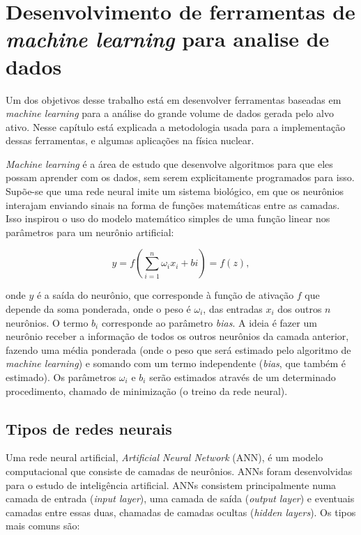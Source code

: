 \documentclass[a4paper,12pt,oneside]{book}
\begin{document}
\chapter{Desenvolvimento de ferramentas de \textit{machine learning} para analise de dados}\label{sec:ml}

\par Um dos objetivos desse trabalho está em desenvolver ferramentas baseadas em \textit{machine learning} para a análise do grande volume de dados gerada pelo alvo ativo. Nesse capítulo está explicada a metodologia usada para a implementação dessas ferramentas, e algumas aplicações na física nuclear.

\par \textit{Machine learning} é a área de estudo que desenvolve algoritmos para que eles possam aprender com os dados, sem serem explicitamente programados para isso\cite{mlbook}. Supõe-se que uma rede neural imite um sistema biológico, em que os neurônios interajam enviando sinais na forma de funções matemáticas entre as camadas. Isso inspirou o uso do modelo matemático simples de uma função linear nos parâmetros para um neurônio artificial\cite{curso}:

\begin{equation}\label{eq:model_n}
    y = f\left(\sum^{n}_{i = 1}\omega_i x_i + bi\right) = f(z),
\end{equation}

\par onde $y$ é a saída do neurônio, que corresponde à função de ativação $f$ que depende da soma ponderada, onde o peso é $\omega_i$, das entradas $x_i$ dos outros $n$ neurônios. O termo $b_i$ corresponde ao parâmetro \textit{bias}. A ideia é fazer um neurônio receber a informação de todos os outros neurônios da camada anterior, fazendo uma média ponderada (onde o peso que será estimado pelo algoritmo de \textit{machine learning}) e somando com um termo independente (\textit{bias}, que também é estimado). Os parâmetros $\omega_i$ e $b_i$ serão estimados através de um determinado procedimento, chamado de minimização (o treino da rede neural).

\section{Tipos de redes neurais}

\par Uma rede neural artificial, \textit{Artificial Neural Network} (ANN), é um modelo computacional que consiste de camadas de neurônios. ANNs foram desenvolvidas para o estudo de inteligência artificial\cite{mlbook, mldiverso}. ANNs consistem principalmente numa camada de entrada (\textit{input layer}), uma camada de saída (\textit{output layer}) e eventuais camadas entre essas duas, chamadas de camadas ocultas (\textit{hidden layers}). Os tipos mais comuns são:
\end{document}
